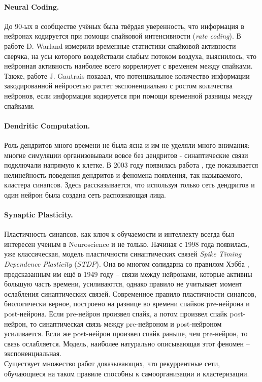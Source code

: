 \documentclass[a4paper,10pt]{article}
\begin{document}
\paragraph*{Neural Coding.} До 90-ых в сообществе учёных была твёрдая уверенность, что информация в нейронах кодируется при помощи спайковой интенсивности (\textit{rate coding}). В работе D. Warland \cite{time_cricket} измерили временные статистики спайковой активности сверчка, на усы которого воздействали слабым потоком воздуха, выяснилось, что нейронная активность наиболее всего коррелирует с временем между спайками. Также, работе J. Gautrais \cite{time_code} показал, что потенциальное количество информации закодированной нейросетью растет экспоненциально с ростом количества нейронов, если информация кодируется при помощи временной разницы между спайками.\\
\paragraph*{Dendritic Computation.}
Роль дендритов много времени не была ясна и им не уделяли много внимания: многие симуляции организовывали вовсе без дендритов - синаптические связи подключали напрямую к клетке. В 2003 году появилась работа \cite{dendr0}, где показывается нелинейность поведения дендритов и феномена появления, так называемого, кластера синапсов. Здесь \cite{dendr1} рассказывается, что используя только сеть дендритов и один нейрон была создана сеть распознающая лица.\\
\paragraph*{Synaptic Plasticity.}
Пластичность синапсов, как ключ к обучаемости и интеллекту всегда был интересен ученым в Neuroscience и не только. Начиная с 1998 года появилась, уже классическая, модель пластичности синаптических связей \cite{syn0} \textit{Spike Timing Dependence Plasticity} (\textit{STDP}). Она во многом солидарна со правилом Хэбба \cite{hebb}, предсказанным им ещё в 1949 году -- связи между нейронами, которые активны большую часть времени, усиливаются, однако правило не учитывает момент ослабления синаптических связей. Современное правило пластичности синапсов, биологически верное, построено на разнице во времени спайков pre-нейрона и post-нейрона. Если pre-нейрон произвел спайк, а потом произвел спайк post-нейрон, то синаптическая связь между pre-нейроном и post-нейроном усиливается. Если же post-нейрон произвел спайк раньше, чем pre-нейрон, то связь ослабляется. Модель, наиболее натурально описывающая этот феномен -- экспоненциальная.\\
\indent Существует множество работ \cite{syn1, syn2, syn3}  доказывающих, что рекуррентные сети, обучающиеся на таком правиле способны к самоорганизации и кластеризации.
\end{document}

